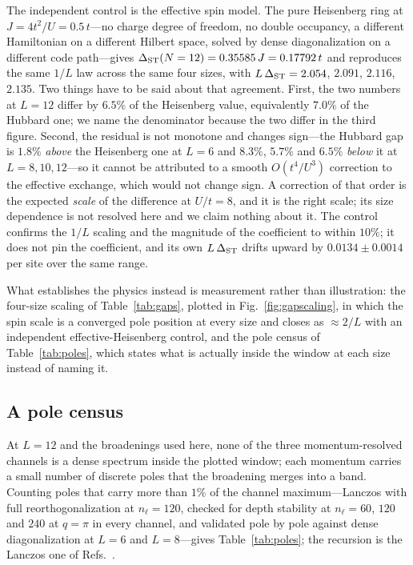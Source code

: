 The independent control is the effective spin model. The pure Heisenberg ring at $J=4t^{2}/U=0.5\,t$---no
charge degree of freedom, no double occupancy, a different Hamiltonian on a different Hilbert
space, solved by dense diagonalization on a different code path---gives
$\Delta_{\rm ST}(N=12)=0.35585\,J=0.17792\,t$ and reproduces the same $1/L$ law across the same four
sizes, with $L\,\Delta_{\rm ST}=2.054$, $2.091$, $2.116$, $2.135$. Two things have to be said about
that agreement. First, the two numbers at $L=12$ differ by $6.5\%$ of
the Heisenberg value, equivalently $7.0\%$ of the Hubbard one; we name the denominator because the
two differ in the third figure. Second, the residual is not monotone and changes sign---the Hubbard
gap is $1.8\%$ \emph{above} the Heisenberg one at $L=6$ and $8.3\%$, $5.7\%$ and $6.5\%$
\emph{below} it at $L=8,10,12$---so it cannot be attributed to a smooth $O(t^{4}/U^{3})$ correction
to the effective exchange, which would not change sign. A correction of that order is the expected
\emph{scale} of the difference at $U/t=8$, and it is the right scale; its size dependence is not
resolved here and we claim nothing about it. The control confirms the $1/L$ scaling and the magnitude
of the coefficient to within $10\%$; it does not pin the coefficient, and its own $L\,\Delta_{\rm ST}$
drifts upward by $0.0134\pm0.0014$ per site over the same range.

What establishes the physics instead is measurement rather than illustration: the four-size scaling of
Table~\ref{tab:gaps}, plotted in Fig.~\ref{fig:gapscaling}, in which the spin scale is a converged
pole position at every size and closes as
$\approx2/L$ with an independent effective-Heisenberg control, and the pole census of
Table~\ref{tab:poles}, which states what is actually inside the window at each size instead of naming
it.

\subsection{A pole census}

At $L=12$ and the broadenings used here, none of the three momentum-resolved channels is a dense
spectrum inside the plotted window; each momentum carries a small number of discrete poles that the
broadening merges into a band. Counting poles that carry more than $1\%$ of the channel
maximum---Lanczos with full reorthogonalization at $n_\ell=120$, checked for depth stability at
$n_\ell=60$, $120$ and $240$ at $q=\pi$ in every channel, and validated pole by pole against dense
diagonalization at $L=6$ and $L=8$---gives Table~\ref{tab:poles}; the recursion is the Lanczos one of
Refs.~\cite{haydock1972,golub2010}.

